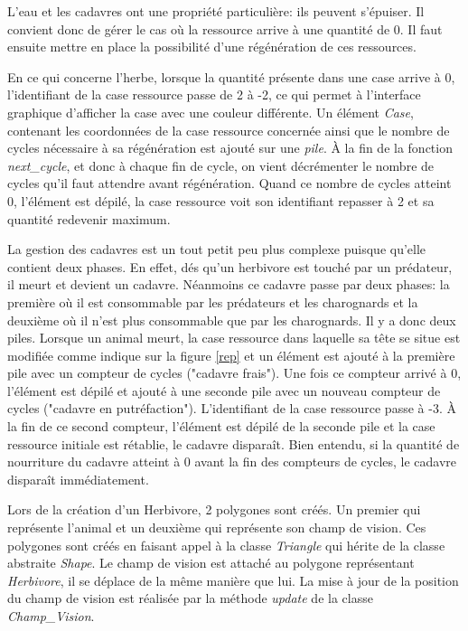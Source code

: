 \documentclass[a4paper,11pt,final,oneside]{article}
\begin{document}
L'eau et les cadavres ont une propriété particulière: ils peuvent s'épuiser. Il convient donc de gérer le cas où la ressource arrive à une quantité de 0. Il faut ensuite mettre en place la possibilité d'une régénération de ces ressources.

En ce qui concerne l'herbe, lorsque la quantité présente dans une case arrive à 0, l'identifiant de la case ressource passe de 2 à -2, ce qui permet à l'interface graphique d'afficher la case avec une couleur différente. Un élément \textit{Case}, contenant les coordonnées de la case ressource concernée ainsi que le nombre de cycles nécessaire à sa régénération est ajouté sur une \textit{pile}. À la fin de la fonction \textit{next\_cycle}, et donc à chaque fin de cycle, on vient décrémenter le nombre de cycles qu'il faut attendre avant régénération. Quand ce nombre de cycles atteint 0, l'élément est dépilé, la case ressource voit son identifiant repasser à 2 et sa quantité redevenir maximum.

La gestion des cadavres est un tout petit peu plus complexe puisque qu'elle contient deux phases. En effet, dés qu'un herbivore est touché par un prédateur, il meurt et devient un cadavre. Néanmoins ce cadavre passe par deux phases: la première où il est consommable par les prédateurs et les charognards et la deuxième où il n'est plus consommable que par les charognards. Il y a donc deux piles. Lorsque un animal meurt, la case ressource dans laquelle sa tête se situe est modifiée comme indique sur la figure \ref{rep} et un élément est ajouté à la première pile avec un compteur de cycles ("cadavre frais"). Une fois ce compteur arrivé à 0, l'élément est dépilé et ajouté à une seconde pile avec un nouveau compteur de cycles ("cadavre en putréfaction"). L'identifiant de la case ressource passe à -3. À la fin de ce second compteur, l'élément est dépilé de la seconde pile et la case ressource initiale est rétablie, le cadavre disparaît.
Bien entendu, si la quantité de nourriture du cadavre atteint à 0 avant la fin des compteurs de cycles, le cadavre disparaît immédiatement.

Lors de la création d'un Herbivore, 2 polygones sont créés. Un premier qui représente l'animal et un deuxième qui représente son champ de vision. Ces polygones sont créés en faisant appel à la classe \textit{Triangle} qui  hérite de la classe abstraite \textit{Shape}. Le champ de vision est attaché au polygone représentant \textit{Herbivore}, il se déplace de la même manière que lui. La mise à jour de la position du champ de vision est réalisée par la méthode \textit{update} de la classe \textit{Champ\_Vision}. 
\end{document}
